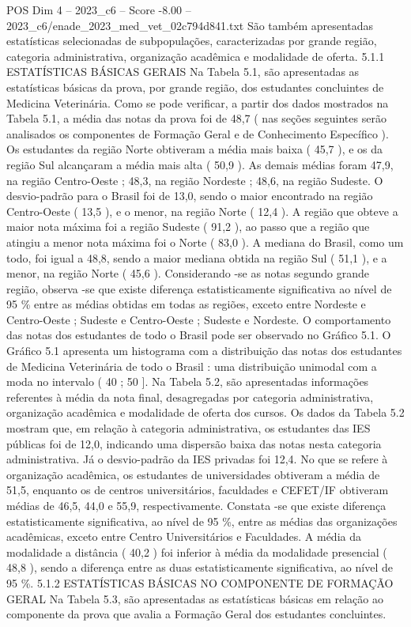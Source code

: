 \begin{textsample}{POS Dim 4 – 2023\_c6 – Score -8.00 – 2023\_c6/enade\_2023\_med\_vet\_02c794d841.txt}
São também apresentadas estatísticas selecionadas de subpopulações, caracterizadas por grande região, categoria administrativa, organização acadêmica e modalidade de oferta. 5.1.1 ESTATÍSTICAS BÁSICAS GERAIS Na Tabela 5.1, são apresentadas as estatísticas básicas da prova, por grande região, dos estudantes concluintes de Medicina Veterinária.
Como se pode verificar, a partir dos dados mostrados na Tabela 5.1, a média das notas da prova foi de 48,7 ( nas seções seguintes serão analisados os componentes de Formação Geral e de Conhecimento Específico ).
Os estudantes da região Norte obtiveram a média mais baixa ( 45,7 ), e os da região Sul alcançaram a média mais alta ( 50,9 ).
As demais médias foram 47,9, na região Centro-Oeste ; 48,3, na região Nordeste ; 48,6, na região Sudeste.
O desvio-padrão para o Brasil foi de 13,0, sendo o maior encontrado na região Centro-Oeste ( 13,5 ), e o menor, na região Norte ( 12,4 ).
A região que obteve a maior nota máxima foi a região Sudeste ( 91,2 ), ao passo que a região que atingiu a menor nota máxima foi o Norte ( 83,0 ).
A mediana do Brasil, como um todo, foi igual a 48,8, sendo a maior mediana obtida na região Sul ( 51,1 ), e a menor, na região Norte ( 45,6 ).
Considerando -se as notas segundo grande região, observa -se que existe diferença estatisticamente significativa ao nível de 95 \% entre as médias obtidas em todas as regiões, exceto entre Nordeste e Centro-Oeste ; Sudeste e Centro-Oeste ; Sudeste e Nordeste.
O comportamento das notas dos estudantes de todo o Brasil pode ser observado no Gráfico 5.1.
O Gráfico 5.1 apresenta um histograma com a distribuição das notas dos estudantes de Medicina Veterinária de todo o Brasil : uma distribuição unimodal com a moda no intervalo ( 40 ; 50 ].
Na Tabela 5.2, são apresentadas informações referentes à média da nota final, desagregadas por categoria administrativa, organização acadêmica e modalidade de oferta dos cursos.
Os dados da Tabela 5.2 mostram que, em relação à categoria administrativa, os estudantes das IES públicas foi de 12,0, indicando uma dispersão baixa das notas nesta categoria administrativa.
Já o desvio-padrão da IES privadas foi 12,4.
No que se refere à organização acadêmica, os estudantes de universidades obtiveram a média de 51,5, enquanto os de centros universitários, faculdades e CEFET/IF obtiveram médias de 46,5, 44,0 e 55,9, respectivamente.
Constata -se que existe diferença estatisticamente significativa, ao nível de 95 \%, entre as médias das organizações acadêmicas, exceto entre Centro Universitários e Faculdades.
A média da modalidade a distância ( 40,2 ) foi inferior à média da modalidade presencial ( 48,8 ), sendo a diferença entre as duas estatisticamente significativa, ao nível de 95 \%. 5.1.2 ESTATÍSTICAS BÁSICAS NO COMPONENTE DE FORMAÇÃO GERAL Na Tabela 5.3, são apresentadas as estatísticas básicas em relação ao componente da prova que avalia a Formação Geral dos estudantes concluintes.

\end{textsample}
